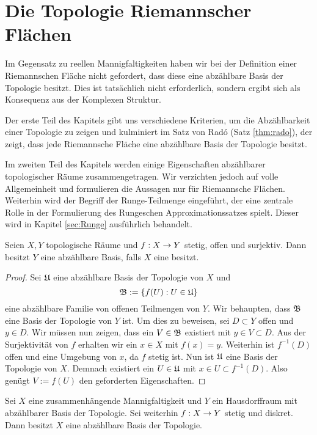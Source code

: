 
\section{Die Topologie Riemannscher Flächen}
\label{sec:Topologie}

Im Gegensatz zu reellen Mannigfaltigkeiten haben wir bei der
Definition einer Riemannschen Fläche nicht gefordert, dass diese eine
abzählbare Basis der Topologie besitzt. Dies ist tatsächlich nicht
erforderlich, sondern ergibt sich als Konsequenz aus der Komplexen
Struktur.

Der erste Teil des Kapitels gibt uns verschiedene Kriterien, um die
Abzählbarkeit einer Topologie zu zeigen und kulminiert im Satz von
Rad\'o (Satz \ref{thm:rado}), der zeigt, dass jede Riemannsche Fläche
eine abzählbare Basis der Topologie besitzt.

Im zweiten Teil des Kapitels werden einige Eigenschaften abzählbarer
topologischer Räume zusammengetragen. Wir verzichten jedoch auf volle
Allgemeinheit und formulieren die Aussagen nur für Riemannsche Flächen.
Weiterhin wird der Begriff der Runge-Teilmenge eingeführt, der eine
zentrale Rolle in der Formulierung des Rungeschen Approximationssatzes
spielt. Dieser wird in Kapitel \ref{sec:Runge} ausführlich behandelt.

\begin{lemma}
  \label{lemma:surj-offen-top}
  Seien $X,Y$ topologische Räume und $f: X \rightarrow Y$ stetig, offen und
  surjektiv. Dann besitzt $Y$ eine abzählbare Basis, falls $X$ eine
  besitzt.
\end{lemma}

\begin{proof}
  Sei $\mathfrak{U}$ eine abzählbare Basis der Topologie von $X$ und
  \[
  \mathfrak{B} := \{ f(U) : U \in \mathfrak{U} \}
  \]
  eine abzählbare Familie von offenen Teilmengen von $Y$. Wir
  behaupten, dass $\mathfrak{B}$ eine Basis der Topologie von $Y$ ist. Um dies
  zu beweisen, sei $D \subset Y$ offen und $y \in D$. Wir
  müssen nun zeigen, dass ein $V \in \mathfrak{B}$ existiert mit $y \in V
  \subset D$. Aus der Surjektivität von $f$ erhalten wir ein $x \in X$ mit $f(x) =
  y$. Weiterhin ist $f^{-1}(D)$ offen und eine Umgebung von $x$, da
  $f$ stetig ist. Nun ist $\mathfrak{U}$ eine Basis der Topologie von
  $X$. Demnach existiert ein $U \in \mathfrak{U}$ mit $x \in U \subset f^{-1}(D)$. Also
  genügt $V:=f(U)$ den geforderten Eigenschaften.
\end{proof}

\begin{lemma}
  \label{lemma:poincare-volterra}
  Sei $X$ eine zusammenhängende Mannigfaltigkeit und $Y$ ein
  Hausdorffraum mit abzählbarer Basis der Topologie. Sei weiterhin
  $f: X \rightarrow Y$ stetig und diskret. Dann besitzt $X$ eine abzählbare
  Basis der Topologie.
\end{lemma}

